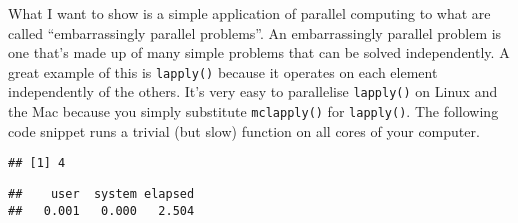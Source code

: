 What I want to show is a simple application of parallel computing to
what are called ``embarrassingly parallel problems''. An embarrassingly
parallel problem is one that's made up of many simple problems that can
be solved independently. A great example of this is \texttt{lapply()}
because it operates on each element independently of the others. It's
very easy to parallelise \texttt{lapply()} on Linux and the Mac because
you simply substitute \texttt{mclapply()} for \texttt{lapply()}. The
following code snippet runs a trivial (but slow) function on all cores
of your computer.

\begin{Shaded}
\begin{Highlighting}[]
\end{Highlighting}
\end{Shaded}

\begin{Shaded}
\begin{Highlighting}[]
\StringTok{ }\NormalTok{()}
\end{Highlighting}
\end{Shaded}

\begin{verbatim}
## [1] 4
\end{verbatim}

\begin{Shaded}
\begin{Highlighting}[]
\StringTok{ }
\NormalTok{\}}

\NormalTok{(}\NormalTok{(}\OperatorTok{:}\NormalTok{, }\NormalTok{(}\NormalTok{)))}
\end{Highlighting}
\end{Shaded}

\begin{verbatim}
##    user  system elapsed 
##   0.001   0.000   2.504
\end{verbatim}

\begin{Shaded}
\begin{Highlighting}[]
\NormalTok{(}\NormalTok{(}\OperatorTok{:}\NormalTok{, }\NormalTok{(}\NormalTok{), }
\end{Highlighting}
\end{Shaded}


